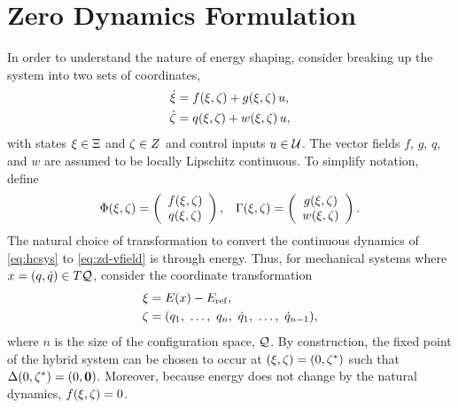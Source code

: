 \section{Zero Dynamics Formulation} \label{sec:zd-form}

In order to understand the nature of energy shaping, consider breaking up the system into two sets of coordinates,
%
\begin{align}
  \nonumber
  \dot {\xi} &= f(\xi, \zeta) + g(\xi, \zeta) \, u,\\
  \dot {\zeta} &= q(\xi, \zeta) + w(\xi, \zeta) \, u,
  \label{eq:zd-vfield}
\end{align}
%
with states $\xi \in \Xi$ and $\zeta \in Z$ and control inputs $u \in \mathcal{U}$.
%
The vector fields $f$, $g$, $q$, and $w$ are assumed to be locally Lipschitz continuous.
%
To simplify notation, define
%
\begin{align}
  \Phi(\xi, \zeta) = \left(\begin{array}{c}
    f(\xi, \zeta)\\
    q(\xi, \zeta)
  \end{array}\right),&&
  \Gamma (\xi, \zeta) = \left(\begin{array}{c}
    g(\xi, \zeta)\\
    w(\xi, \zeta)
  \end{array}\right).
\end{align}
%
The natural choice of transformation to convert the continuous dynamics of \eqref{eq:hcsys} to \eqref{eq:zd-vfield} is through energy.
%
Thus, for mechanical systems where $x = (q, \dot{q}) \in T\mathcal{Q}$, consider the coordinate transformation
%
\begin{align}
  \nonumber
  \xi &= E(x) - E_{\mathrm{ref}},\\
  \zeta &= (q_{1}, \ \ldots, \ q_{n}, \ \dot{q}_{1}, \ \ldots, \ \dot{q}_{n-1}),
\end{align}
where $n$ is the size of the configuration space, $\mathcal{Q}$.
%
By construction, the fixed point of the hybrid system can be chosen to occur at $(\xi, \zeta) = (0, \zeta^{*})$ such that $\Delta(0, \zeta^{*}) = (0, {\mathbf 0})$.
%
Moreover, because energy does not change by the natural dynamics, $f(\xi, \zeta) = 0$.
%

